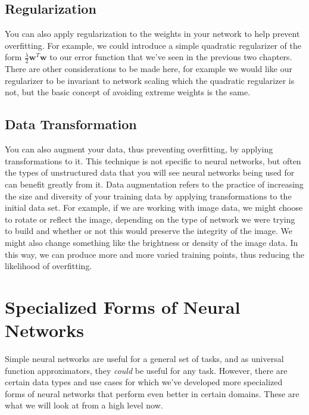 
\subsection{Regularization}
You can also apply regularization to the weights in your network to help prevent overfitting. For example, we could introduce a simple quadratic regularizer of the form $\frac{\lambda}{2} \textbf{w}^{T}\textbf{w}$ to our error function that we've seen in the previous two chapters. There are other considerations to be made here, for example we would like our regularizer to be invariant to network scaling which the quadratic regularizer is not, but the basic concept of avoiding extreme weights is the same.

\subsection{Data Transformation}
You can also augment your data, thus preventing overfitting, by applying transformations to it. This technique is not specific to neural networks, but often the types of unstructured data that you will see neural networks being used for can benefit greatly from it. Data augmentation refers to the practice of increasing the size and diversity of your training data by applying transformations to the initial data set. For example, if we are working with image data, we might choose to rotate or reflect the image, depending on the type of network we were trying to build and whether or not this would preserve the integrity of the image. We might also change something like the brightness or density of the image data. In this way, we can produce more and more varied training points, thus reducing the likelihood of overfitting.

\section{Specialized Forms of Neural Networks}
Simple neural networks are useful for a general set of tasks, and as universal function approximators, they \textit{could} be useful for any task. However, there are certain data types and use cases for which we've developed more specialized forms of neural networks that perform even better in certain domains. These are what we will look at from a high level now.

